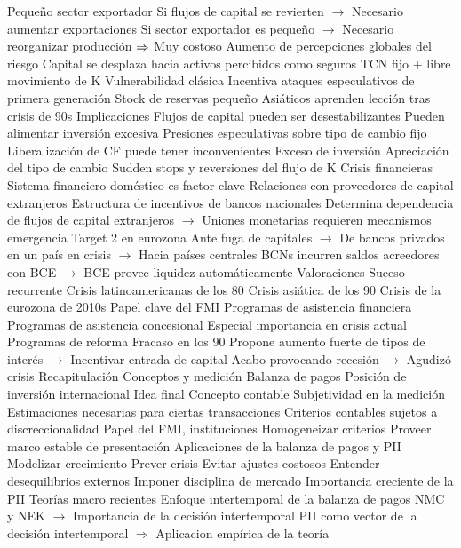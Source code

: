 \documentclass{nuevotema}
\begin{document}
\begin{esquemal}
				\4 Pequeño sector exportador
				\4[] Si flujos de capital se revierten
				\4[] $\to$ Necesario aumentar exportaciones
				\4[] Si sector exportador es pequeño
				\4[] $\to$ Necesario reorganizar producción
				\4[] $\Rightarrow$ Muy costoso
				\4 Aumento de percepciones globales del riesgo
				\4[] Capital se desplaza hacia activos percibidos como seguros
				\4 TCN fijo + libre movimiento de K
				\4[] Vulnerabilidad clásica
				\4[] Incentiva ataques especulativos de primera generación
				\4 Stock de reservas pequeño
				\4[] Asiáticos aprenden lección tras crisis de 90s
		\2 Implicaciones
			\3 Flujos de capital pueden ser desestabilizantes
				\4 Pueden alimentar inversión excesiva
				\4 Presiones especulativas sobre tipo de cambio fijo
			\3 Liberalización de CF puede tener inconvenientes
				\4 Exceso de inversión
				\4 Apreciación del tipo de cambio
				\4 Sudden stops y reversiones del flujo de K
				\4 Crisis financieras
			\3 Sistema financiero doméstico es factor clave
				\4 Relaciones con proveedores de capital extranjeros
				\4 Estructura de incentivos de bancos nacionales
				\4[] Determina dependencia de flujos de capital extranjeros
				\4[] $\to$
			\3 Uniones monetarias requieren mecanismos emergencia
				\4 Target 2 en eurozona
				\4[] Ante fuga de capitales
				\4[] $\to$ De bancos privados en un país en crisis
				\4[] $\to$ Hacia países centrales
				\4[] BCNs incurren saldos acreedores con BCE
				\4[] $\to$ BCE provee liquidez automáticamente
		\2 Valoraciones
			\3 Suceso recurrente
				\4 Crisis latinoamericanas de los 80
				\4 Crisis asiática de los 90
				\4 Crisis de la eurozona de 2010s
			\3 Papel clave del FMI
				\4 Programas de asistencia financiera
				\4[]
				\4 Programas de asistencia concesional
				\4[] Especial importancia en crisis actual
				\4 Programas de reforma
				\4[]
				\4 Fracaso en los 90
				\4[] Propone aumento fuerte de tipos de interés
				\4[] $\to$ Incentivar entrada de capital
				\4[] Acabo provocando recesión
				\4[] $\to$ Agudizó crisis
	\1 
		\2 Recapitulación
			\3 Conceptos y medición
			\3 Balanza de pagos
			\3 Posición de inversión internacional
		\2 Idea final
			\3 Concepto contable
				\4 Subjetividad en la medición
				\4[] Estimaciones necesarias para ciertas transacciones
				\4[] Criterios contables sujetos a discreccionalidad
				\4 Papel del FMI, instituciones
				\4[] Homogeneizar criterios
				\4[] Proveer marco estable de presentación
			\3 Aplicaciones de la balanza de pagos y PII
				\4 Modelizar crecimiento
				\4 Prever crisis
				\4[] Evitar ajustes costosos
				\4 Entender desequilibrios externos
				\4 Imponer disciplina de mercado
			\3 Importancia creciente de la PII
				\4 Teorías macro recientes
				\4[] Enfoque intertemporal de la balanza de pagos
				\4[] NMC y NEK
				\4[] $\to$ Importancia de la decisión intertemporal
				\4 PII como vector de la decisión intertemporal
				\4[] $\Rightarrow$ Aplicacion empírica de la teoría
\end{esquemal}
\end{document}
